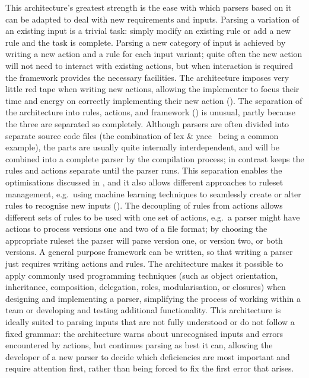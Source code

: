 This architecture's greatest strength is the ease with which parsers based
on it can be adapted to deal with new requirements and inputs.  Parsing a
variation of an existing input is a trivial task: simply modify an existing
rule or add a new rule and the task is complete.  Parsing a new category of
input is achieved by writing a new action and a rule for each input
variant; quite often the new action will not need to interact with existing
actions, but when interaction is required the framework provides the
necessary facilities.  The architecture imposes very little red tape when
writing new actions, allowing the implementer to focus their time and
energy on correctly implementing their new action ().  The separation of the architecture into rules, actions,
and framework () is unusual, partly because the
three are separated so completely.  Although parsers are often divided into
separate source code files (the combination of lex \&
yacc~\cite{lex-and-yacc-book} being a common example), the parts are
usually quite internally interdependent, and will be combined into a
complete parser by the compilation process; in contrast \parsername{} keeps
the rules and actions separate until the parser runs.  This separation
enables the optimisations discussed in , and
it also allows different approaches to ruleset management, e.g.\ using
machine learning techniques to seamlessly create or alter rules to
recognise new inputs ().  The
decoupling of rules from actions allows different sets of rules to be used
with one set of actions, e.g.\ a parser might have actions to process
versions one and two of a file format; by choosing the appropriate ruleset
the parser will parse version one, or version two, or both versions.  A
general purpose framework can be written, so that writing a parser just
requires writing actions and rules.  The architecture makes it possible to
apply commonly used programming techniques (such as object orientation,
inheritance, composition, delegation, roles, modularisation, or closures)
when designing and implementing a parser, simplifying the process of
working within a team or developing and testing additional functionality.
This architecture is ideally suited to parsing inputs that are not fully
understood or do not follow a fixed grammar: the architecture warns about
unrecognised inputs and errors encountered by actions, but continues
parsing as best it can, allowing the developer of a new parser to decide
which deficiencies are most important and require attention first, rather
than being forced to fix the first error that arises.

